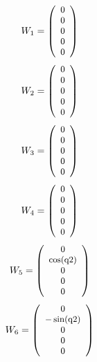 \documentclass[fleqn, a4paper, 5pt, russian]{article}
\begin{document}
\begin{landscape}
\begin{equation}
\small{
	W_{1}=
	\left(\begin{array}{c} 0\\ 0\\ 0\\ 0\\ 0 \end{array}\right)
}\end{equation}
\begin{equation}
\small{
	W_{2}=
	\left(\begin{array}{c} 0\\ 0\\ 0\\ 0\\ 0 \end{array}\right)
}\end{equation}
\begin{equation}
\small{
	W_{3}=
	\left(\begin{array}{c} 0\\ 0\\ 0\\ 0\\ 0 \end{array}\right)
}\end{equation}
\begin{equation}
\small{
	W_{4}=
	\left(\begin{array}{c} 0\\ 0\\ 0\\ 0\\ 0 \end{array}\right)
}\end{equation}
\begin{equation}
\small{
	W_{5}=
	\left(\begin{array}{c} 0\\ \cos\!\left(\mathrm{q2}\right)\\ 0\\ 0\\ 0 \end{array}\right)
}\end{equation}
\begin{equation}
\small{
	W_{6}=
	\left(\begin{array}{c} 0\\ - \sin\!\left(\mathrm{q2}\right)\\ 0\\ 0\\ 0 \end{array}\right)
}\end{equation}

\end{landscape}
\end{document}
